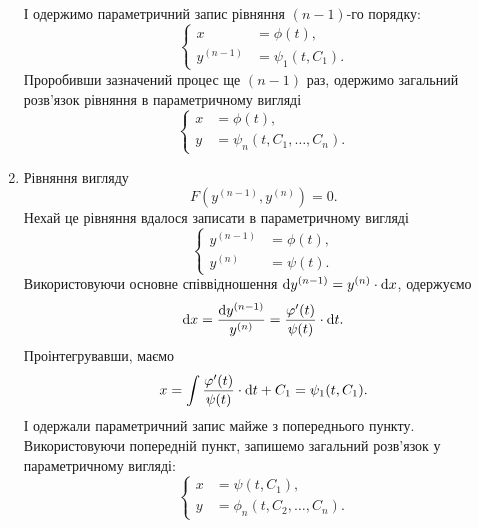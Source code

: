 \begin{enumerate}
І одержимо параметричний запис рівняння $(n-1)$-го порядку:
\begin{equation*}
	\left\{
		\begin{aligned}
			x &= \phi(t), \\
			y^{(n-1)} &= \psi_1(t, C_1).
		\end{aligned}
	\right.
\end{equation*}
Проробивши зазначений процес ще $(n-1)$ раз, одержимо загальний розв’язок рівняння в параметричному вигляді
\begin{equation*}
	\left\{
		\begin{aligned}
			x &= \phi(t), \\
			y &= \psi_n(t, C_1, \ldots, C_n).
		\end{aligned}
	\right.
\end{equation*}
 
\item Рівняння вигляду
\begin{equation*}
	F \left( y^{(n-1)}, y^{(n)} \right) = 0.
\end{equation*}
Нехай це рівняння вдалося записати в параметричному вигляді 
\begin{equation*}
	\left\{
		\begin{aligned}
			y^{(n-1)} &= \phi(t), \\
			y^{(n)} &= \psi(t).
		\end{aligned}
	\right.
\end{equation*}
Використовуючи основне співвідношення $\mathop{}\!\mathrm{d} y^{(n-1)} = y^{(n)} \cdot \mathop{}\!\mathrm{d} x$, одержуємо
\begin{equation*}
	\mathop{}\!\mathrm{d} x = \frac{\mathop{}\!\mathrm{d} y^{(n-1)}}{y^{(n)}} = \frac{\varphi'(t)}{\psi(t)} \cdot \mathop{}\!\mathrm{d} t.
\end{equation*}
Проінтегрувавши, маємо
\begin{equation*}
	x = \int \frac{\varphi'(t)}{\psi(t)} \cdot \mathop{}\!\mathrm{d} t + C_1 = \psi_1(t, C_1).
\end{equation*}
І одержали параметричний запис майже з попереднього пункту. \\

Використовуючи попередній пункт, запишемо загальний розв’язок у параметричному вигляді:
\begin{equation*}
	\left\{
		\begin{aligned}
			x &= \psi(t, C_1), \\
			y &= \phi_n(t, C_2, \ldots, C_n).
		\end{aligned}
	\right.
\end{equation*}
 

\end{enumerate}
